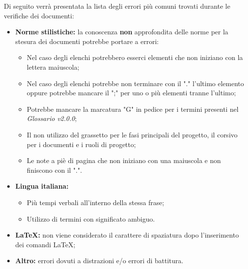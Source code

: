 Di seguito verrà presentata la lista degli errori più comuni trovati durante le verifiche dei documenti:
\begin{itemize}
	\item \textbf{Norme stilistiche:} la conoscenza \textbf{non} approfondita delle norme per la stesura dei documenti potrebbe portare a errori:
		\begin{itemize}
			\item Nel caso degli elenchi potrebbero esserci elementi che non iniziano con la lettera maiuscola;
			\item Nel caso degli elenchi potrebbe non terminare con il "." l'ultimo elemento oppure potrebbe mancare il ";" per uno o più elementi tranne l'ultimo; 
			\item Potrebbe mancare la marcatura "G" in pedice per i termini presenti nel \textit{Glossario v2.0.0};
			\item Il non utilizzo del grassetto per le fasi principali del progetto, il corsivo per i documenti e i ruoli di progetto;
			\item Le note a piè di pagina che non iniziano con una maiuscola e non finiscono con il ".".
		\end{itemize}
	\item \textbf{Lingua italiana:} 
		\begin{itemize}
			\item Più tempi verbali all'interno della stessa frase;
			\item Utilizzo di termini con significato ambiguo.
		\end{itemize}
	\item \textbf{\LaTeX:} non viene considerato il carattere di spaziatura dopo l'inserimento dei  comandi \LaTeX;
	\item \textbf{Altro:} errori dovuti a distrazioni e/o errori di battitura.
\end{itemize}

